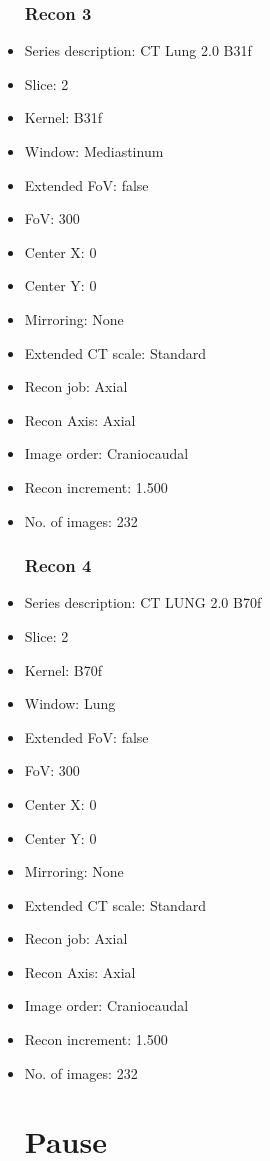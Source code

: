 \documentclass[12pt]{article}
\begin{document}
\begin{itemize}
\subsubsection{Recon 3}
\item Series description: CT Lung 2.0 B31f
\item Slice: 2
\item Kernel: B31f
\item Window: Mediastinum
\item Extended FoV: false
\item FoV: 300
\item Center X: 0
\item Center Y: 0
\item Mirroring: None
\item Extended CT scale: Standard
\item Recon job: Axial
\item Recon Axis: Axial
\item Image order: Craniocaudal
\item Recon increment: 1.500
\item No. of images: 232
\subsubsection{Recon 4}
\item Series description: CT LUNG 2.0 B70f
\item Slice: 2
\item Kernel: B70f
\item Window: Lung
\item Extended FoV: false
\item FoV: 300
\item Center X: 0
\item Center Y: 0
\item Mirroring: None
\item Extended CT scale: Standard
\item Recon job: Axial
\item Recon Axis: Axial
\item Image order: Craniocaudal
\item Recon increment: 1.500
\item No. of images: 232
\section{Pause}

\end{itemize}
\end{document}
